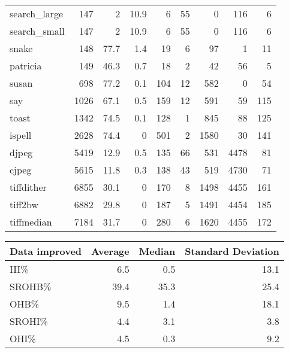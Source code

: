 \begin{tabular}{lrrrrrrrr}
 search\_large    &      147 &      2   &   10.9 &    6 &   55 &      0 &   116 &     6 \\
 search\_small    &      147 &      2   &   10.9 &    6 &   55 &      0 &   116 &     6 \\
 snake           &      148 &     77.7 &    1.4 &   19 &    6 &     97 &     1 &    11 \\
 patricia        &      149 &     46.3 &    0.7 &   18 &    2 &     42 &    56 &     5 \\
 susan           &      698 &     77.2 &    0.1 &  104 &   12 &    582 &     0 &    54 \\
 say             &     1026 &     67.1 &    0.5 &  159 &   12 &    591 &    59 &   115 \\
 toast           &     1342 &     74.5 &    0.1 &  128 &    1 &    845 &    88 &   125 \\
 ispell          &     2628 &     74.4 &    0   &  501 &    2 &   1580 &    30 &   141 \\
 djpeg           &     5419 &     12.9 &    0.5 &  135 &   66 &    531 &  4478 &    81 \\
 cjpeg           &     5615 &     11.8 &    0.3 &  138 &   43 &    519 &  4730 &    71 \\
 tiffdither      &     6855 &     30.1 &    0   &  170 &    8 &   1498 &  4455 &   161 \\
 tiff2bw         &     6882 &     29.8 &    0   &  187 &    5 &   1491 &  4454 &   185 \\
 tiffmedian      &     7184 &     31.7 &    0   &  280 &    6 &   1620 &  4455 &   172 \\
\hline
\end{tabular}\begin{tabular}{lrrr}
\hline
 Data improved   &   Average &   Median &   Standard Deviation \\
\hline
 III\%            &       6.5 &      0.5 &                 13.1 \\
 SROHB\%          &      39.4 &     35.3 &                 25.4 \\
 OHB\%            &       9.5 &      1.4 &                 18.1 \\
 SROHI\%          &       4.4 &      3.1 &                  3.8 \\
 OHI\%            &       4.5 &      0.3 &                  9.2 \\
\hline
\end{tabular}